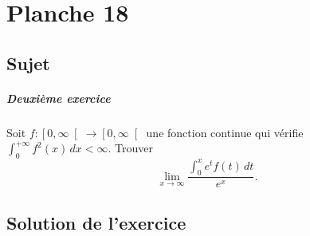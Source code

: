 \chapter{Planche 18}

\section{Sujet}

\paragraph{Deuxième exercice}

Soit $f : \left[0,\infty\right[ \to \left[0,\infty\right[$ une fonction continue qui vérifie $\int_0^{+\infty} f^2(x)\,dx < \infty$.
Trouver
\[
\lim_{x\to\infty} \frac{\int_0^x e^t f(t)\,dt}{e^x}.
\]

\section{Solution de l'exercice}

